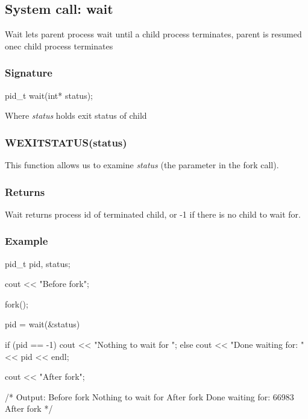 \documentclass{report}
\begin{document}
        \bigbreak \noindent 
        \subsection{System call: wait}
        \bigbreak \noindent 
        \begin{concept}
           Wait lets parent process wait until a child process terminates, parent is resumed onec child process terminates 
        \end{concept}
        \bigbreak \noindent 
        \subsubsection{Signature}
        \bigbreak \noindent 
        \begin{cppcode}
            pid_t wait(int* status);
        \end{cppcode}
        \bigbreak \noindent 
        Where \textit{status} holds exit status of child
        \bigbreak \noindent 
        \subsubsection{WEXITSTATUS(status)}
        \bigbreak \noindent 
        This function allows us to examine \textit{status} (the parameter in the fork call).

        \bigbreak \noindent 
        \subsubsection{Returns}
        \bigbreak \noindent 
        Wait returns process id of terminated child, or -1 if there is no child to wait for.

        \pagebreak 
        \subsubsection{Example}
        \bigbreak \noindent 
        \begin{cppcode}
        pid_t pid, status;

        cout << "Before fork\n";

        fork();

        pid = wait(&status)

        if (pid == -1) {
            cout << "Nothing to wait for \n";
        } else {
            cout << "Done waiting for: " << pid << endl;
        }

        cout << "After fork\n";

        /* Output:
             Before fork
             Nothing to wait for 
             After fork
             Done waiting for: 66983
             After fork
        */
        \end{cppcode}
\end{document}
